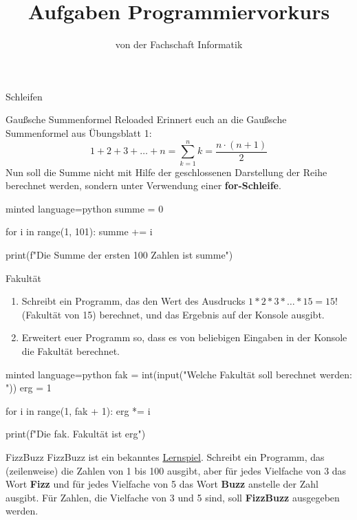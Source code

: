 
\title{Aufgaben Programmiervorkurs}
\subtitle{von der Fachschaft Informatik\hfill\ptitle}

\maketitle{}

\begin{task}[points=auto]{Schleifen}
    \begin{subtask*}[points=0]{Gaußsche Summenformel Reloaded }
        Erinnert euch an die Gaußsche Summenformel aus Übungsblatt 1:
        $$1+2+3+\ldots+n = \sum_{k=1}^nk=\frac{n\cdot(n+1)}{2}$$
        Nun soll die Summe nicht mit Hilfe der geschlossenen Darstellung der Reihe berechnet werden, sondern unter Verwendung einer \textbf{for-Schleife}.

        \begin{solution}
            \begin{codeBlock}[]{minted language=python}
                summe = 0

                for i in range(1, 101):
                    summe += i

                print(f"Die Summe der ersten 100 Zahlen ist {summe}")
            \end{codeBlock}
        \end{solution}
    \end{subtask*}
    \begin{subtask*}[points=0]{Fakultät }
        \begin{enumerate}
            \item Schreibt ein Programm, das den Wert des Ausdrucks $1 * 2 * 3 * \ldots * 15 = 15!$ (Fakultät von 15) berechnet, und das Ergebnis auf der Konsole ausgibt.
            \item Erweitert euer Programm so, dass es von beliebigen Eingaben in der Konsole die Fakultät berechnet.
        \end{enumerate}

        \begin{solution}
            \begin{codeBlock}[]{minted language=python}
                fak = int(input("Welche Fakultät soll berechnet werden: "))
                erg = 1

                for i in range(1, fak + 1):
                    erg *= i

                print(f"Die {fak}. Fakultät ist {erg}")
            \end{codeBlock}
        \end{solution}
    \end{subtask*}
    \begin{subtask*}[points=0]{FizzBuzz }
        FizzBuzz ist ein bekanntes \href{https://en.wikipedia.org/wiki/Fizz_buzz}{Lernspiel}. Schreibt ein Programm, das (zeilenweise) die Zahlen von 1 bis 100 ausgibt, aber für jedes Vielfache von 3 das Wort \textbf{Fizz} und für jedes Vielfache von 5 das Wort \textbf{Buzz} anstelle der Zahl ausgibt. Für Zahlen, die Vielfache von 3 und 5 sind, soll \textbf{FizzBuzz} ausgegeben werden.


\end{subtask*}
\end{task}

